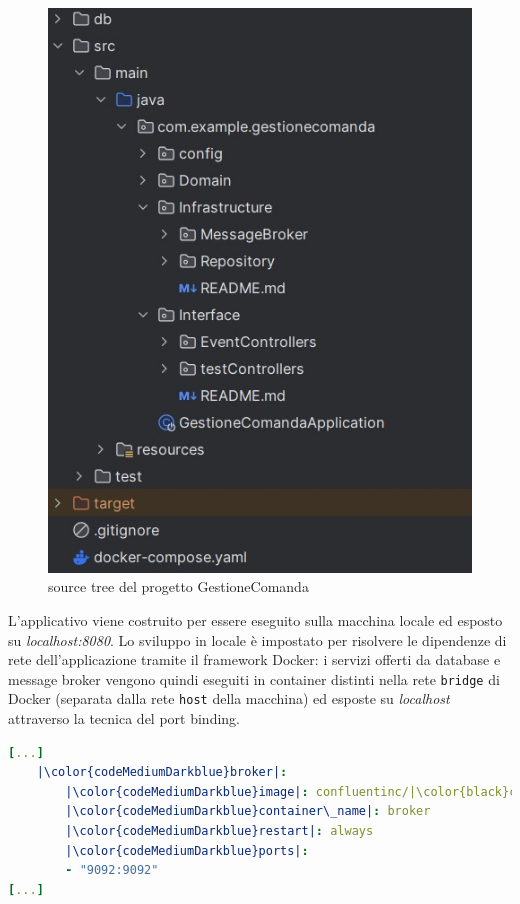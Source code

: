 \begin{figure}[htbp]
	\centering
	\includegraphics[scale=0.50]{iterazione1/images/source tree.jpg}
	\caption{source tree del progetto GestioneComanda
 \label{fig:srctreeGestioneComanda}}
\end{figure}

L'applicativo viene costruito per essere eseguito sulla macchina locale ed esposto su \textit{localhost:8080}. Lo sviluppo in locale è impostato per risolvere le dipendenze di rete dell'applicazione tramite il framework Docker: i servizi offerti da database e message broker vengono quindi eseguiti in container distinti nella rete \texttt{bridge} di Docker (separata dalla rete \texttt{host} della macchina) ed esposte su \textit{localhost} attraverso la tecnica del port binding.

\begin{lstlisting}[language=yaml, caption={port-binding del servizio \textit{broker} alla voce \textit{ports} (porta\_host:porta\_container) }, label=lst:port-binding]
[...]
	|\color{codeMediumDarkblue}broker|:
		|\color{codeMediumDarkblue}image|: confluentinc/|\color{black}cp-kafka:7.3.0|
		|\color{codeMediumDarkblue}container\_name|: broker
		|\color{codeMediumDarkblue}restart|: always
		|\color{codeMediumDarkblue}ports|:
		- "9092:9092"
[...]
\end{lstlisting}

\clearpage